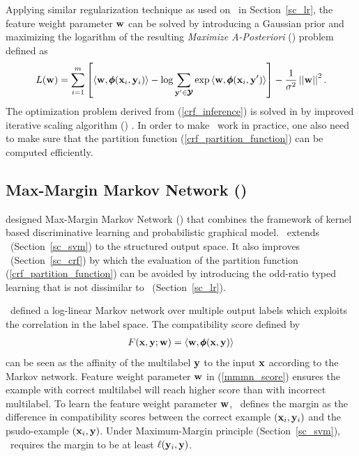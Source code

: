 {Applying similar regularization technique as used on \lr\ in Section~\ref{sc_lr}, the feature weight parameter $\mathbf {w}$ can be solved by introducing a Gaussian prior and maximizing the logarithm of the resulting \textit{Maximize A-Posteriori} (\map) problem \citep{taskar02} defined as
\begin{align}
	L(\mathbf {w}) = \sum_{i=1}^{m}\left[\langle \mathbf {w}, \pmb \phi(\mathbf {x}_i,\mathbf {y}_i) \rangle-\log{\sum_{\mathbf {y}'\in\pmb {\mathcal{Y}}}{\exp{\langle \mathbf {w}, \pmb \phi(\mathbf {x}_i,\mathbf {y}') \rangle}}}\right] - \frac{1}{\sigma^2}\left|\left| \mathbf {w} \right|\right|^2. \label{crf_inference}
\end{align}
The optimization problem derived from (\ref{crf_inference}) is solved in \citep{lafferty01} by improved iterative scaling algorithm (\iis) \citep{Pietra97inducing}.
In order to make \crf\ work in practice, one also need to make sure that the partition function (\ref{crf_partition_function}) can be computed efficiently.



%
% 
\subsection{Max-Margin Markov Network (\mmmn)} \label{sc_mmmn}

\citet{Taskar04max} designed Max-Margin Markov Network (\mmmn) that combines the framework of kernel based discriminative learning and probabilistic graphical model.
\mmmn\ extends \svm\ (Section~\ref{sc_svm}) to the structured output space.
It also improves \crf\ (Section~\ref{sc_crf}) by which the evaluation of the partition function (\ref{crf_partition_function}) can be avoided by introducing the odd-ratio typed learning that is not dissimilar to \lr\ (Section~\ref{sc_lr}).

\mmmn\ defined a log-linear Markov network over multiple output labels which exploits the correlation in the label space.
The compatibility score defined by 
\begin{align}
	F(\mathbf {x},\mathbf {y};\mathbf {w}) = \langle \mathbf {w}, \pmb \phi(\mathbf {x},\mathbf {y}) \rangle \label{mmmn_score}
\end{align}
can be seen as the affinity of the multilabel $\mathbf {y}$ to the input $\mathbf {x}$ according to the Markov network.
Feature weight parameter $\mathbf {w}$ in (\ref{mmmn_score}) ensures the example with correct multilabel will reach higher score than with incorrect multilabel.
To learn the feature weight parameter $\mathbf {w}$, \mmmn\ defines the margin as the difference in compatibility scores between the correct example $(\mathbf {x}_i,\mathbf {y}_i)$ and the psudo-example $(\mathbf {x}_i,\mathbf {y})$.
Under Maximum-Margin principle (Section~\ref{sc_svm}), \mmmn\ requires the margin to be at least $\mathbf {\ell}(\mathbf {y}_i,{\mathbf {y}})$.

}
